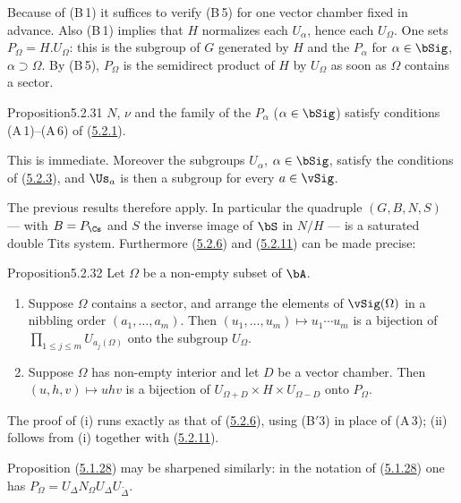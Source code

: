 \documentclass[12pt,a4paper,oneside,english]{smfart}
\makeatletter
\newcommand{\btanchor}[1]{\leavevmode\Hy@raisedlink{\hypertarget{bt:#1}{}}}
\newcommand{\btref}[1]{\hyperlink{bt:#1}{#1}}
\theoremstyle{definition}
\theoremstyle{bt}
\makeatother
\begin{document}
Because of (B\,1) it suffices to verify (B\,5) for one vector chamber fixed in
advance. Also (B\,1) implies that $H$ normalizes each $U_\alpha$, hence each
$U_\Omega$. One sets $P_\Omega=H.U_\Omega$: this is the subgroup of $G$
generated by $H$ and the $P_\alpha$ for $\alpha\in\bSig$, $\alpha\supset\Omega$.
By (B\,5), $P_\Omega$ is the semidirect product of $H$ by $U_\Omega$ as soon as
$\Omega$ contains a sector.

\begin{stmt}{Proposition}{5.2.31}\btanchor{5.2.31}
$N$, $\nu$ and the family of the $P_\alpha$ ($\alpha\in\bSig$) satisfy
conditions (A\,1)--(A\,6) of (\btref{5.2.1}).
\end{stmt}
\noindent This is immediate. Moreover the subgroups $U_\alpha$,
$\alpha\in\bSig$, satisfy the conditions of (\btref{5.2.3}), and $\Us_a$ is then a
subgroup for every $a\in\vSig$.

\btanchor{5.2.32} The previous results therefore apply. In particular the quadruple
$(G,B,N,S)$ --- with $B=P_{\Cs}$ and $S$ the inverse image of $\bS$ in $N/H$ ---
is a saturated double Tits system. Furthermore (\btref{5.2.6}) and (\btref{5.2.11}) can be made
precise:

\begin{stmt}{Proposition}{5.2.32}
Let $\Omega$ be a non-empty subset of $\bA$.
\begin{enumerate}
\item[(i)] Suppose $\Omega$ contains a sector, and arrange the elements of
$\vSig(\Omega)$ in a nibbling order $(a_1,\dots,a_m)$. Then
$(u_1,\dots,u_m)\mapsto u_1\cdots u_m$ is a bijection of
$\prod_{1\le j\le m}U_{a_j(\Omega)}$ onto the subgroup $U_\Omega$.
\item[(ii)] Suppose $\Omega$ has non-empty interior and let $D$ be a vector
chamber. Then $(u,h,v)\mapsto uhv$ is a bijection of
$U_{\Omega+D}\times H\times U_{\Omega-D}$ onto $P_\Omega$.
\end{enumerate}
\end{stmt}
\noindent The proof of (i) runs exactly as that of (\btref{5.2.6}), using (B$'$3) in
place of (A\,3); (ii) follows from (i) together with (\btref{5.2.11}).

\btanchor{5.2.33} Proposition (\btref{5.1.28}) may be sharpened similarly: in the notation
of (\btref{5.1.28}) one has $P_\Omega=U_\Delta N_\Omega U_\Delta U_{\widetilde\Delta}$.
\end{document}
